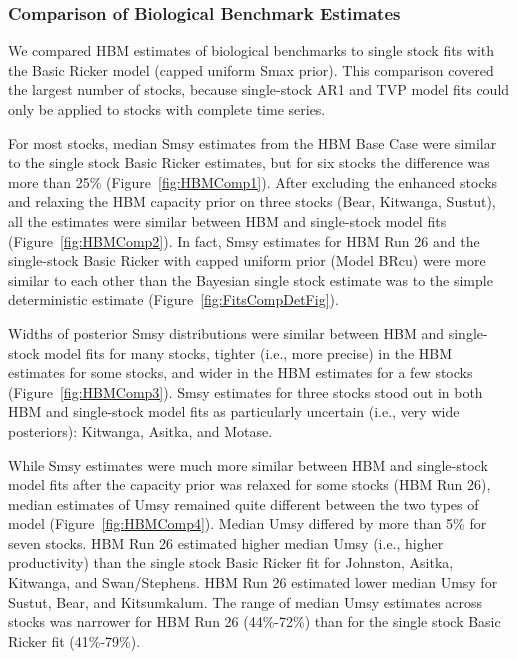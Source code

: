 \documentclass[french,11pt]{book}
\begin{document}
\subsubsection{Comparison of Biological Benchmark Estimates}\label{comparison-of-biological-benchmark-estimates}

We compared HBM estimates of biological benchmarks to single stock fits with the Basic Ricker model (capped uniform Smax prior). This comparison covered the largest number of stocks, because single-stock AR1 and TVP model fits could only be applied to stocks with complete time series.

For most stocks, median Smsy estimates from the HBM Base Case were similar to the single stock Basic Ricker estimates, but for six stocks the difference was more than 25\% (Figure~\ref{fig:HBMComp1}). After excluding the enhanced stocks and relaxing the HBM capacity prior on three stocks (Bear, Kitwanga, Sustut), all the estimates were similar between HBM and single-stock model fits (Figure~\ref{fig:HBMComp2}). In fact, Smsy estimates for HBM Run 26 and the single-stock Basic Ricker with capped uniform prior (Model BRcu) were more similar to each other than the Bayesian single stock estimate was to the simple deterministic estimate (Figure~\ref{fig:FitsCompDetFig}).

Widths of posterior Smsy distributions were similar between HBM and single-stock model fits for many stocks, tighter (i.e., more precise) in the HBM estimates for some stocks, and wider in the HBM estimates for a few stocks (Figure~\ref{fig:HBMComp3}). Smsy estimates for three stocks stood out in both HBM and single-stock model fits as particularly uncertain (i.e., very wide posteriors): Kitwanga, Asitka, and Motase.

While Smsy estimates were much more similar between HBM and single-stock model fits after the capacity prior was relaxed for some stocks (HBM Run 26), median estimates of Umsy remained quite different between the two types of model (Figure~\ref{fig:HBMComp4}). Median Umsy differed by more than 5\% for seven stocks. HBM Run 26 estimated higher median Umsy (i.e., higher productivity) than the single stock Basic Ricker fit for Johnston, Asitka, Kitwanga, and Swan/Stephens. HBM Run 26 estimated lower median Umsy for Sustut, Bear, and Kitsumkalum. The range of median Umsy estimates across stocks was narrower for HBM Run 26 (44\%-72\%) than for the single stock Basic Ricker fit (41\%-79\%).

\clearpage
\end{document}
